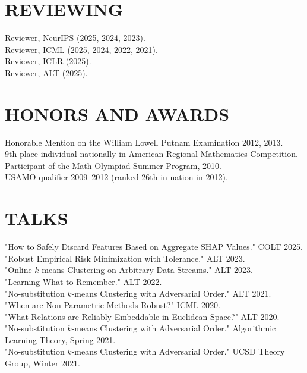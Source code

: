 \documentclass{res}
\begin{document}
\begin{resume}
\section{REVIEWING}
Reviewer, NeurIPS (2025, 2024, 2023).\\
Reviewer, ICML (2025, 2024, 2022, 2021).\\
Reviewer, ICLR (2025).\\
Reviewer, ALT (2025).\\

\section{HONORS AND AWARDS}
Honorable Mention on the William Lowell Putnam Examination 2012, 2013.\\
9th place individual nationally in American Regional Mathematics Competition.\\
Participant of the Math Olympiad Summer Program, 2010.\\
USAMO qualifier 2009–2012 (ranked 26th in nation in 2012).  

\section{TALKS}
"How to Safely Discard Features Based on Aggregate SHAP Values." COLT 2025. \\

"Robust Empirical Risk Minimization with Tolerance." ALT 2023. \\

"Online $k$-means Clustering on Arbitrary Data Streams." ALT 2023. \\

"Learning What to Remember." ALT 2022. \\

"No-substitution $k$-means Clustering with Adversarial Order." ALT 2021. \\

"When are Non-Parametric Methods Robust?" ICML 2020. \\

"What Relations are Reliably Embeddable in Euclidean Space?" ALT 2020. \\

"No-substitution $k$-means Clustering with Adversarial Order." Algorithmic Learning Theory, Spring 2021. \\

"No-substitution $k$-means Clustering with Adversarial Order." UCSD Theory Group, Winter 2021. \\


\end{resume}
\end{document}
